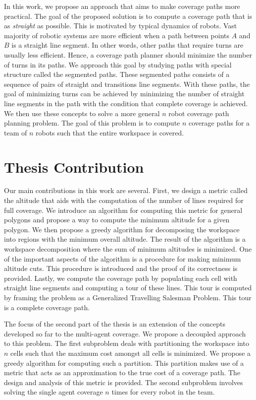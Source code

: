 \documentclass[../main.tex]{subfiles}
\begin{document}
In this work, we propose an approach that aims to make coverage paths more practical. The goal of the proposed solution is to compute a coverage path that is as \emph{straight} as possible. This is motivated by typical dynamics of robots. Vast majority of robotic systems are more efficient when a path between points $A$ and $B$ is a straight line segment. In other words, other paths that require turns are usually less efficient. Hence, a coverage path planner should minimize the number of turns in its paths. We approach this goal by studying paths with special structure called the segmented paths. These segmented paths consists of a sequence of pairs of straight and transitions line segments. With these paths, the goal of minimizing turns can be achieved by minimizing the number of straight line segments in the path with the condition that complete coverage is achieved. We then use these concepts to solve a more general $n$ robot coverage path planning problem. The goal of this problem is to compute $n$ coverage paths for a team of $n$ robots such that the entire workspace is covered.

\section{Thesis Contribution}
\label{section:thesis_contribution}

Our main contributions in this work are several. First, we design a metric called the altitude that aids with the computation of the number of lines required for full coverage. We introduce an algorithm for computing this metric for general polygons and propose a way to compute the minimum altitude for a given polygon. We then propose a greedy algorithm for decomposing the workspace into regions with the minimum overall altitude. The result of the algorithm is a workspace decomposition where the sum of minimum altitudes is minimized. One of the important aspects of the algorithm is a procedure for making minimum altitude cuts. This procedure is introduced and the proof of its correctness is provided. Lastly, we compute the coverage path by populating each cell with straight line segments and computing a tour of these lines. This tour is computed by framing the problem as a Generalized Travelling Salesman Problem. This tour is a complete coverage path. 

The focus of the second part of the thesis is an extension of the concepts developed so far to the multi-agent coverage. We propose a decoupled approach to this problem. The first subproblem deals with partitioning the workspace into $n$ cells such that the maximum cost amongst all cells is minimized. We propose a greedy algorithm for computing such a partition. This partition makes use of a metric that acts as an approximation to the true cost of a coverage path. The design and analysis of this metric is provided. The second subproblem involves solving the single agent coverage $n$ times for every robot in the team.
\end{document}
